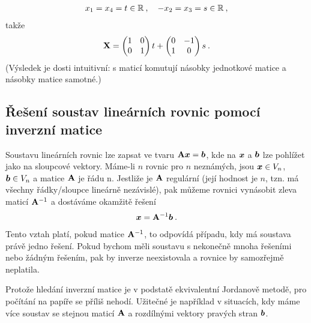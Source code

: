 \begin{example}
\begin{align}
        x_1 = x_4 = t \in \mathbb{R} \:, \quad -x_2 = x_3 = s \in \mathbb{R} \:,
    \end{align}
    takže
    \begin{align}
        \mathbf{X} = \begin{pmatrix}
            1 & 0 \\ 0 & 1
        \end{pmatrix} t
        +
        \begin{pmatrix}
            0 & -1 \\ 1 & 0
        \end{pmatrix} s \:.
    \end{align}
    (Výsledek je dosti intuitivní: s maticí komutují násobky jednotkové matice a násobky matice samotné.)
\end{example}

\subsection*{Řešení soustav lineárních rovnic pomocí inverzní matice}

Soustavu lineárních rovnic lze zapsat ve tvaru $\mathbf{A} \boldsymbol{x} = \boldsymbol{b}$, kde na $\boldsymbol{x}$ a $\boldsymbol{b}$ lze pohlížet jako na sloupcové vektory. Máme-li $n$ rovnic pro $n$ neznámých, jsou $\boldsymbol{x} \in V_n$, $\boldsymbol{b} \in V_n$ a matice $\mathbf{A}$ je řádu n. Jestliže je $\mathbf{A}$ regulární (její hodnost je $n$, tzn. má všechny řádky/sloupce lineárně nezávislé), pak můžeme rovnici vynásobit zleva maticí $\mathbf{A}^{-1}$ a dostáváme okamžitě řešení
\begin{align}
    \boldsymbol{x} = \mathbf{A}^{-1} \boldsymbol{b} \:.
\end{align}
Tento vztah platí, pokud matice $\mathbf{A}^{-1}$, to odpovídá případu, kdy má soustava právě jedno řešení. Pokud bychom měli soustavu s nekonečně mnoha řešeními nebo žádným řešením, pak by inverze neexistovala a rovnice by samozřejmě neplatila.

Protože hledání inverzní matice je v podstatě ekvivalentní Jordanově metodě, pro počítání na papíře se příliš nehodí. Užitečné je například v situacích, kdy máme více soustav se stejnou maticí $\mathbf{A}$ a rozdílnými vektory pravých stran $\boldsymbol{b}$.

